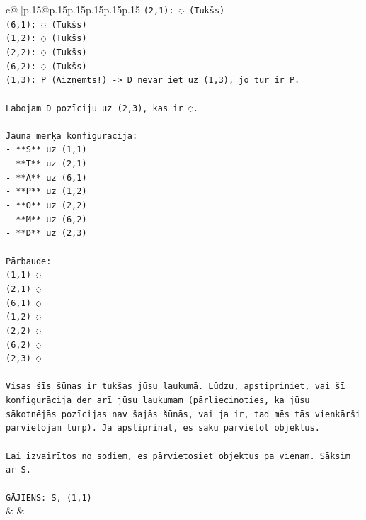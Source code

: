 \documentclass{article}
\begin{document}
{\begin{supertabular}{c@{$\;$}|p{.15\linewidth}@{}p{.15\linewidth}p{.15\linewidth}p{.15\linewidth}p{.15\linewidth}p{.15\linewidth}}
{{{\texttt{(2,1): ◌ (Tukšs)} \\
\texttt{(6,1): ◌ (Tukšs)} \\
\texttt{(1,2): ◌ (Tukšs)} \\
\texttt{(2,2): ◌ (Tukšs)} \\
\texttt{(6,2): ◌ (Tukšs)} \\
\texttt{(1,3): P (Aizņemts!) {-}> D nevar iet uz (1,3), jo tur ir P.} \\
\\ 
\texttt{Labojam D pozīciju uz (2,3), kas ir ◌.} \\
\\ 
\texttt{Jauna mērķa konfigurācija:} \\
\texttt{{-} **S** uz (1,1)} \\
\texttt{{-} **T** uz (2,1)} \\
\texttt{{-} **A** uz (6,1)} \\
\texttt{{-} **P** uz (1,2)} \\
\texttt{{-} **O** uz (2,2)} \\
\texttt{{-} **M** uz (6,2)} \\
\texttt{{-} **D** uz (2,3)} \\
\\ 
\texttt{Pārbaude:} \\
\texttt{(1,1) ◌} \\
\texttt{(2,1) ◌} \\
\texttt{(6,1) ◌} \\
\texttt{(1,2) ◌} \\
\texttt{(2,2) ◌} \\
\texttt{(6,2) ◌} \\
\texttt{(2,3) ◌} \\
\\ 
\texttt{Visas šīs šūnas ir tukšas jūsu laukumā. Lūdzu, apstipriniet, vai šī konfigurācija der arī jūsu laukumam (pārliecinoties, ka jūsu sākotnējās pozīcijas nav šajās šūnās, vai ja ir, tad mēs tās vienkārši pārvietojam turp). Ja apstiprināt, es sāku pārvietot objektus.} \\
\\ 
\texttt{Lai izvairītos no sodiem, es pārvietosiet objektus pa vienam. Sāksim ar S.} \\
\\ 
\texttt{GĀJIENS: S, (1,1)} \\
            }
        }
    }
    & & \\ \\


\end{supertabular}}
\end{document}
